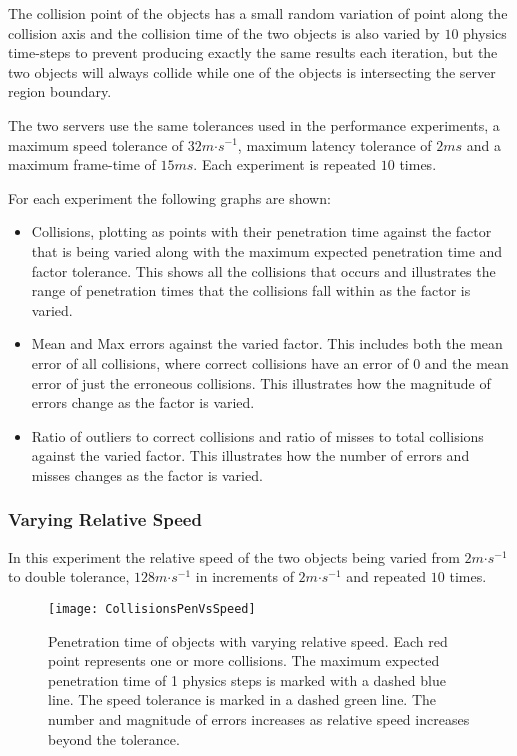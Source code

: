 The collision point of the objects has a small random variation of point along the collision axis and the collision time of the two objects is also varied by $10$ physics time-steps to prevent producing exactly the same results each iteration, but the two objects will always collide while one of the objects is intersecting the server region boundary.

The two servers use the same tolerances used in the performance experiments, a maximum speed tolerance of $32m\mathord{\cdot}s^{-1}$, maximum latency tolerance of $2ms$ and a maximum frame-time of $15ms$. Each experiment is repeated $10$ times.

For each experiment the following graphs are shown:
\begin{itemize}
	\item Collisions, plotting as points with their penetration time against the factor that is being varied along with the maximum expected penetration time and factor tolerance. This shows all the collisions that occurs and illustrates the range of penetration times that the collisions fall within as the factor is varied. %
	\item Mean and Max errors against the varied factor. This includes both the mean error of all collisions, where correct collisions have an error of $0$ and the mean error of just the erroneous collisions. This illustrates how the magnitude of errors change as the factor is varied.
	\item Ratio of outliers to correct collisions and ratio of misses to total collisions against the varied factor. This illustrates how the number of errors and misses changes as the factor is varied.
\end{itemize}


\subsubsection{Varying Relative Speed}

In this experiment the relative speed of the two objects being varied from $2m\mathord{\cdot}s^{-1}$ to double tolerance, $128m\mathord{\cdot}s^{-1}$ in increments of $2m\mathord{\cdot}s^{-1}$ and repeated $10$ times.

\begin{figure}[!t]
	\centering
	\texttt{[image: CollisionsPenVsSpeed]}
	\caption{Penetration time of objects with varying relative speed. Each red point represents one or more collisions. The maximum expected penetration time of 1 physics steps is marked with a dashed blue line. The speed tolerance is marked in a dashed green line. The number and magnitude of errors increases as relative speed increases beyond the tolerance.}
	\label{fig_CollisionsPenVsSpeed}
\end{figure}


